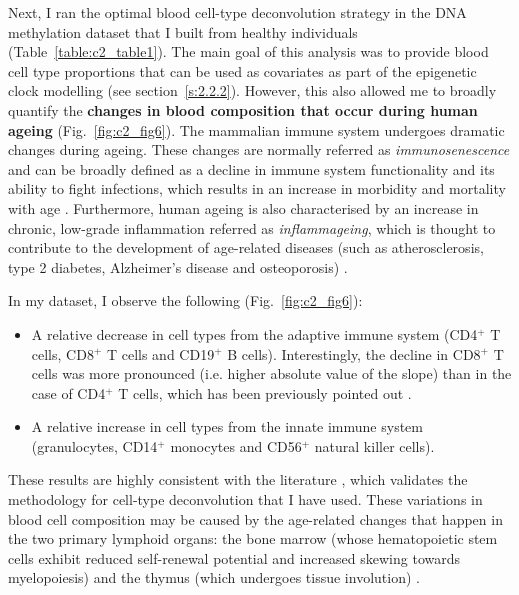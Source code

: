 Next, I ran the optimal blood cell-type deconvolution strategy in the DNA methylation dataset that I built from healthy individuals (Table~\ref{table:c2_table1}). The main goal of this analysis was to provide blood cell type proportions that can be used as covariates as part of the epigenetic clock modelling (see section~\ref{s:2.2.2}). However, this also allowed me to broadly quantify the \textbf{changes in blood composition that occur during human ageing} (Fig.~\ref{fig:c2_fig6}). The mammalian immune system undergoes dramatic changes during ageing. These changes are normally referred as \textit{immunosenescence} and can be broadly defined as a decline in immune system functionality and its ability to fight infections, which results in an increase in morbidity and mortality with age \cite{Nikolich-Zugich2018}. Furthermore, human ageing is also characterised by an increase in chronic, low-grade inflammation referred as \textit{inflammageing}, which is thought to contribute to the development of age-related diseases (such as atherosclerosis, type 2 diabetes, Alzheimer’s disease and osteoporosis) \cite{Franceschi2007}.

\bigskip

In my dataset, I observe the following (Fig.~\ref{fig:c2_fig6}):

\begin{itemize}
	
	\item A relative decrease in cell types from the adaptive immune system (CD4$^+$ T cells, CD8$^+$ T cells and CD19$^+$ B cells). Interestingly, the decline in CD8$^+$ T cells was more pronounced (i.e. higher absolute value of the slope) than in the case of CD4$^+$ T cells, which has been previously pointed out \cite{Czesnikiewicz-Guzik2008}. 
	
	\item A relative increase in cell types from the innate immune system (granulocytes, CD14$^+$ monocytes and CD56$^+$ natural killer cells).
	
\end{itemize}

These results are highly consistent with the literature \cite{Jaffe2014,Czesnikiewicz-Guzik2008,Kuranda2011,Chen2016a,Seidler2010,Manser2016}, which validates the methodology for cell-type deconvolution that I have used. These variations in blood cell composition may be caused by the age-related changes that happen in the two primary lymphoid organs: the bone marrow (whose hematopoietic stem cells exhibit reduced self-renewal potential and increased skewing towards myelopoiesis) and the thymus (which undergoes tissue involution)  \cite{Chinn2012}. 

